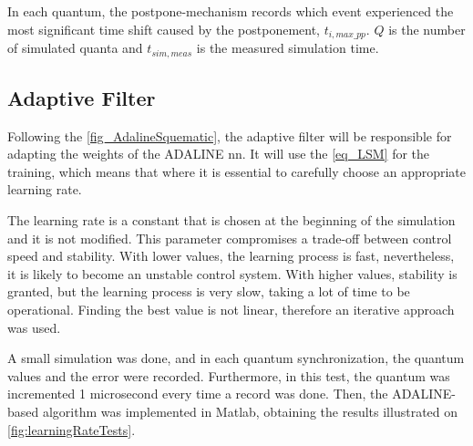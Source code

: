 In each quantum, the postpone-mechanism records which event experienced the most significant time shift caused by the postponement, 
$t_{i,max\_pp}$. $Q$ is the number of simulated quanta and $t_{sim,meas}$ is the measured simulation time. 


\subsection{Adaptive Filter}

Following the \autoref{fig_AdalineSquematic}, the adaptive filter will be responsible for adapting the weights of the ADALINE \gls{nn}. It will use 
the \autoref{eq_LSM} for the training, which means that where it is essential to carefully choose an appropriate learning rate.

The learning rate is a constant that is chosen at the beginning of the simulation and it is not modified. This parameter compromises a trade-off 
between control speed and stability. With lower values, the learning process is fast, nevertheless, it is likely to become an unstable control 
system. With higher values, stability is granted, but the learning process is very slow, taking a lot of time to be operational.
Finding the best value is not linear, therefore an iterative approach was used. 

A small simulation was done, and in each quantum synchronization, the quantum values and the error were recorded. Furthermore, 
in this test, the quantum was incremented 1 microsecond every time a record was done. Then, the ADALINE-based algorithm was implemented in Matlab, 
obtaining the results illustrated on \autoref{fig:learningRateTests}.

